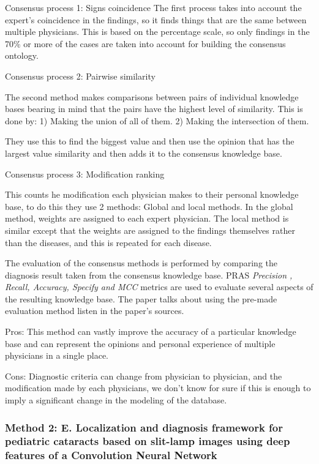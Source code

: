 \documentclass[conference]{IEEEtran}
\begin{document}
	Consensus process 1: Signs coincidence
	The first process takes into account the expert's coincidence in the findings, so it finds things that are the same between multiple physicians. This is based on the percentage scale, so only findings in the 70\% or more of the cases are taken into account for building the consensus ontology. 

	Consensus process 2: Pairwise similarity

	The second method makes comparisons between pairs of individual knowledge bases bearing in mind that the pairs have the highest level of similarity. This is done by:
	1) Making the union of all of them.
	2) Making the intersection of them.

	They use this to find the biggest value and then use the opinion that has the largest value similarity and then adds it to the consensus knowledge base.

	Consensus process 3: Modification ranking

	This counts he modification each physician makes to their personal knowledge base, to do this they use 2 methods: Global and local methods. In the global method, weights are assigned to each expert physician.
	The local method is similar except that the weights are assigned to the findings themselves rather than the diseases, and this is repeated for each disease.

	The evaluation of the consensus methods is performed by comparing the diagnosis result taken from the consensus knowledge base. PRAS \textit{Precision , Recall, Accuracy, Specify and MCC} metrics are used to evaluate several aspects of the resulting knowledge base. The paper talks about using the pre-made evaluation method listen in the paper's sources.

	Pros: This method can vastly improve the accuracy of a particular knowledge base and can represent the opinions and personal experience of multiple physicians in a single place.

	Cons: Diagnostic criteria can change from physician to physician, and the modification made by each physicians, we don't know for sure if this is enough to imply a significant change in the modeling of the database. 

\subsubsection{Method 2: E. Localization and diagnosis framework for pediatric cataracts based on slit-lamp images using deep features of a Convolution Neural Network\\}
\end{document}
